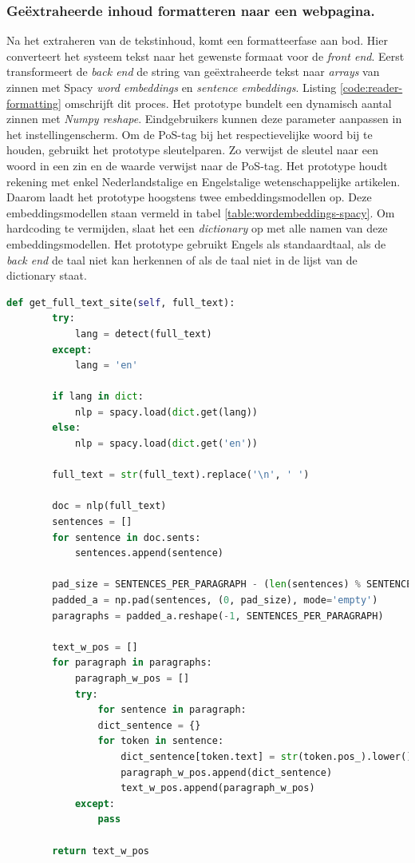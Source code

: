 \subsubsection{Geëxtraheerde inhoud formatteren naar een webpagina.}

Na het extraheren van de tekstinhoud, komt een formatteerfase aan bod. Hier converteert het systeem tekst naar het gewenste formaat voor de \textit{front end}. Eerst transformeert de \textit{back end} de string van geëxtraheerde tekst naar \textit{arrays} van zinnen met Spacy \textit{word embeddings} en \textit{sentence embeddings}. Listing \ref{code:reader-formatting} omschrijft dit proces. Het prototype bundelt een dynamisch aantal zinnen met \textit{Numpy reshape}. Eindgebruikers kunnen deze parameter aanpassen in het instellingenscherm. Om de PoS-tag bij het respectievelijke woord bij te houden, gebruikt het prototype sleutelparen. Zo verwijst de sleutel naar een woord in een zin en de waarde verwijst naar de PoS-tag. Het prototype houdt rekening met enkel Nederlandstalige en Engelstalige wetenschappelijke artikelen. Daarom laadt het prototype hoogstens twee embeddingsmodellen op. Deze embeddingsmodellen staan vermeld in tabel \ref{table:wordembeddings-spacy}. Om hardcoding te vermijden, slaat het een \textit{dictionary} op met alle namen van deze embeddingsmodellen. Het prototype gebruikt Engels als standaardtaal, als de \textit{back end} de taal niet kan herkennen of als de taal niet in de lijst van de dictionary staat. 

\begin{lstlisting}[language=Python, caption={Het formatteren van de tekst naar een formaat voor de website.}, label={code:reader-formatting}]
	def get_full_text_site(self, full_text):
		try:
			lang = detect(full_text)
		except:
			lang = 'en'
		
		if lang in dict:
			nlp = spacy.load(dict.get(lang))
		else:
			nlp = spacy.load(dict.get('en'))
		
		full_text = str(full_text).replace('\n', ' ')
		
		doc = nlp(full_text)
		sentences = []
		for sentence in doc.sents:
			sentences.append(sentence)
		
		pad_size = SENTENCES_PER_PARAGRAPH - (len(sentences) % SENTENCES_PER_PARAGRAPH)
		padded_a = np.pad(sentences, (0, pad_size), mode='empty')
		paragraphs = padded_a.reshape(-1, SENTENCES_PER_PARAGRAPH)
		
		text_w_pos = []
		for paragraph in paragraphs:
			paragraph_w_pos = []
			try:
				for sentence in paragraph:
				dict_sentence = {}
				for token in sentence:
					dict_sentence[token.text] = str(token.pos_).lower()
					paragraph_w_pos.append(dict_sentence)    
					text_w_pos.append(paragraph_w_pos)
			except:
				pass
				
		return text_w_pos
\end{lstlisting}

